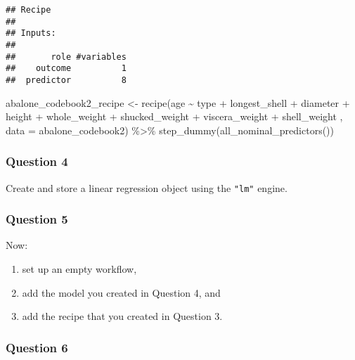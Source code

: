 \documentclass[
]{article}
\newenvironment{Shaded}{\begin{snugshade}}{\end{snugshade}}
\newcommand{\AttributeTok}[1]{\textcolor[rgb]{0.77,0.63,0.00}{#1}}
\newcommand{\FunctionTok}[1]{\textcolor[rgb]{0.00,0.00,0.00}{#1}}
\newcommand{\NormalTok}[1]{#1}
\newcommand{\OtherTok}[1]{\textcolor[rgb]{0.56,0.35,0.01}{#1}}
\newcommand{\SpecialCharTok}[1]{\textcolor[rgb]{0.00,0.00,0.00}{#1}}
\providecommand{\tightlist}{%
  \setlength{\itemsep}{0pt}\setlength{\parskip}{0pt}}
\begin{document}
\begin{verbatim}
## Recipe
## 
## Inputs:
## 
##       role #variables
##    outcome          1
##  predictor          8
\end{verbatim}

\begin{Shaded}
\begin{Highlighting}[]
\NormalTok{abalone\_codebook2\_recipe }\OtherTok{\textless{}{-}} \FunctionTok{recipe}\NormalTok{(age }\SpecialCharTok{\textasciitilde{}}\NormalTok{ type }\SpecialCharTok{+}\NormalTok{ longest\_shell }\SpecialCharTok{+}\NormalTok{ diameter }\SpecialCharTok{+}\NormalTok{ height }\SpecialCharTok{+}\NormalTok{ whole\_weight }\SpecialCharTok{+}\NormalTok{ shucked\_weight }\SpecialCharTok{+}\NormalTok{ viscera\_weight }\SpecialCharTok{+}\NormalTok{ shell\_weight , }\AttributeTok{data =}\NormalTok{ abalone\_codebook2) }\SpecialCharTok{\%\textgreater{}\%}
  \FunctionTok{step\_dummy}\NormalTok{(}\FunctionTok{all\_nominal\_predictors}\NormalTok{())}
\end{Highlighting}
\end{Shaded}

\hypertarget{question-4}{%
\subsubsection{Question 4}\label{question-4}}

Create and store a linear regression object using the \texttt{"lm"}
engine.

\hypertarget{question-5}{%
\subsubsection{Question 5}\label{question-5}}

Now:

\begin{enumerate}
\def\labelenumi{\arabic{enumi}.}
\tightlist
\item
  set up an empty workflow,
\item
  add the model you created in Question 4, and
\item
  add the recipe that you created in Question 3.
\end{enumerate}

\hypertarget{question-6}{%
\subsubsection{Question 6}\label{question-6}}
\end{document}
